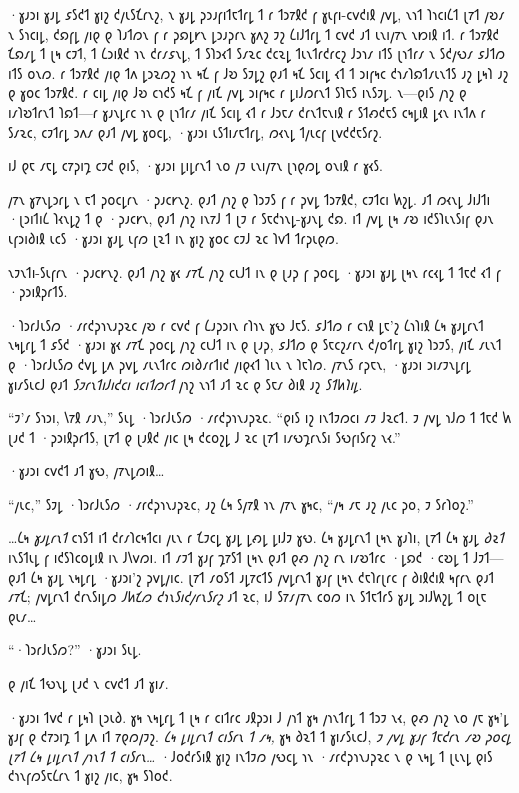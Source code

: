 ·𐑣𐑨𐑮𐑦 𐑣𐑨𐑛 𐑭𐑕𐑒𐑑 𐑣𐑦𐑟 𐑒𐑢𐑧𐑕𐑗𐑩𐑯𐑟, 𐑯 𐑣𐑨𐑛 𐑜𐑮𐑨𐑝𐑦𐑑𐑱𐑑𐑩𐑛 𐑑 𐑩 𐑑𐑮𐑳𐑙𐑒 𐑝 𐑣𐑧𐑝𐑦-𐑤𐑫𐑒𐑦𐑙 𐑢𐑫𐑛, 𐑯𐑪𐑑 𐑐𐑪𐑤𐑦𐑖𐑑 𐑚𐑳𐑑 𐑢𐑹𐑥 𐑯 𐑕𐑪𐑤𐑦𐑛, 𐑒𐑸𐑝𐑛 𐑢𐑦𐑞 𐑞 𐑐𐑨𐑑𐑼𐑯 𐑝 𐑩 𐑜𐑸𐑛𐑾𐑯 𐑛𐑮𐑨𐑜𐑩𐑯 𐑣𐑵𐑟 𐑲𐑟 𐑖𐑦𐑓𐑑𐑩𐑛 𐑑 𐑤𐑫𐑒 𐑨𐑑 𐑧𐑯𐑦𐑢𐑳𐑯 𐑯𐑽𐑦𐑙 𐑦𐑑. 𐑩 𐑑𐑮𐑳𐑙𐑒 𐑗𐑸𐑥𐑛 𐑑 𐑚𐑰 𐑤𐑲𐑑, 𐑑 𐑖𐑮𐑦𐑙𐑒 𐑪𐑯 𐑒𐑩𐑥𐑭𐑯𐑛, 𐑑 𐑕𐑐𐑮𐑬𐑑 𐑕𐑥𐑷𐑤 𐑒𐑤𐑷𐑛 𐑑𐑧𐑯𐑑𐑩𐑒𐑩𐑤𐑟 𐑓𐑮𐑪𐑥 𐑦𐑑𐑕 𐑚𐑪𐑑𐑩𐑥 𐑯 𐑕𐑒𐑢𐑻𐑥 𐑭𐑓𐑑𐑼 𐑦𐑑𐑕 𐑴𐑯𐑼. 𐑩 𐑑𐑮𐑳𐑙𐑒 𐑢𐑦𐑞 𐑑𐑵 𐑛𐑮𐑷𐑼𐑟 𐑪𐑯 𐑰𐑗 𐑝 𐑓𐑹 𐑕𐑲𐑛𐑟 𐑞𐑨𐑑 𐑰𐑗 𐑕𐑤𐑦𐑛 𐑬𐑑 𐑑 𐑮𐑦𐑝𐑰𐑤 𐑒𐑪𐑥𐑐𐑸𐑑𐑥𐑧𐑯𐑑𐑕 𐑨𐑟 𐑛𐑰𐑐 𐑨𐑟 𐑞 𐑣𐑴𐑤 𐑑𐑮𐑳𐑙𐑒. 𐑩 𐑤𐑦𐑛 𐑢𐑦𐑞 𐑓𐑹 𐑤𐑪𐑒𐑕 𐑰𐑗 𐑝 𐑢𐑦𐑗 𐑢𐑫𐑛 𐑮𐑦𐑝𐑰𐑤 𐑩 𐑛𐑦𐑓𐑼𐑩𐑯𐑑 𐑕𐑐𐑱𐑕 𐑦𐑯𐑕𐑲𐑛. 𐑯—𐑞𐑦𐑕 𐑢𐑪𐑟 𐑞 𐑦𐑥𐑐𐑹𐑑𐑩𐑯𐑑 𐑐𐑸𐑑—𐑩 𐑣𐑨𐑯𐑛𐑩𐑤 𐑪𐑯 𐑞 𐑚𐑪𐑑𐑩𐑥 𐑢𐑦𐑗 𐑕𐑤𐑦𐑛 𐑬𐑑 𐑩 𐑓𐑮𐑱𐑥 𐑒𐑩𐑯𐑑𐑱𐑯𐑦𐑙 𐑩 𐑕𐑑𐑺𐑒𐑱𐑕 𐑤𐑰𐑛𐑦𐑙 𐑛𐑬𐑯 𐑦𐑯𐑑𐑵 𐑩 𐑕𐑥𐑷𐑤, 𐑤𐑲𐑑𐑩𐑛 𐑮𐑵𐑥 𐑞𐑨𐑑 𐑢𐑫𐑛 𐑣𐑴𐑤𐑛, ·𐑣𐑨𐑮𐑦 𐑧𐑕𐑑𐑦𐑥𐑱𐑑𐑩𐑛, 𐑼𐑬𐑯𐑛 𐑑𐑢𐑧𐑤𐑝 𐑚𐑫𐑒𐑒𐑱𐑕𐑩𐑟.

𐑦𐑓 𐑞𐑱 𐑥𐑱𐑛 𐑤𐑳𐑜𐑦𐑡 𐑤𐑲𐑒 𐑞𐑦𐑕, ·𐑣𐑨𐑮𐑦 𐑛𐑦𐑛𐑩𐑯𐑑 𐑯𐑴 𐑢𐑲 𐑧𐑯𐑦𐑢𐑳𐑯 𐑚𐑪𐑞𐑼𐑛 𐑴𐑯𐑦𐑙 𐑩 𐑣𐑬𐑕.

𐑢𐑳𐑯 𐑣𐑳𐑯𐑛𐑮𐑩𐑛 𐑯 𐑱𐑑 𐑜𐑴𐑤𐑛𐑩𐑯 ·𐑜𐑨𐑤𐑾𐑯𐑟. 𐑞𐑨𐑑 𐑢𐑪𐑟 𐑞 𐑐𐑮𐑲𐑕 𐑝 𐑩 𐑜𐑫𐑛 𐑑𐑮𐑳𐑙𐑒, 𐑤𐑲𐑑𐑤𐑦 𐑿𐑟𐑛. 𐑨𐑑 𐑼𐑬𐑯𐑛 𐑓𐑦𐑓𐑑𐑦 ·𐑚𐑮𐑦𐑑𐑦𐑖 𐑐𐑬𐑯𐑛𐑟 𐑑 𐑞 ·𐑜𐑨𐑤𐑾𐑯, 𐑞𐑨𐑑 𐑢𐑪𐑟 𐑦𐑯𐑳𐑓 𐑑 𐑚𐑲 𐑩 𐑕𐑱𐑒𐑪𐑯𐑛-𐑣𐑨𐑯𐑛 𐑒𐑸. 𐑦𐑑 𐑢𐑫𐑛 𐑚𐑰 𐑥𐑹 𐑦𐑒𐑕𐑐𐑧𐑯𐑕𐑦𐑝 𐑞𐑨𐑯 𐑧𐑝𐑮𐑦𐑔𐑦𐑙 𐑧𐑤𐑕 ·𐑣𐑨𐑮𐑦 𐑣𐑨𐑛 𐑧𐑝𐑼 𐑚𐑷𐑑 𐑦𐑯 𐑣𐑦𐑟 𐑣𐑴𐑤 𐑤𐑲𐑓 𐑷𐑤 𐑐𐑫𐑑 𐑑𐑩𐑜𐑧𐑞𐑼.

𐑯𐑲𐑯𐑑𐑦-𐑕𐑧𐑝𐑩𐑯 ·𐑜𐑨𐑤𐑾𐑯𐑟. 𐑞𐑨𐑑 𐑢𐑪𐑟 𐑣𐑬 𐑥𐑳𐑗 𐑢𐑪𐑟 𐑤𐑧𐑓𐑑 𐑦𐑯 𐑞 𐑚𐑨𐑜 𐑝 𐑜𐑴𐑤𐑛 ·𐑣𐑨𐑮𐑦 𐑣𐑨𐑛 𐑚𐑰𐑯 𐑩𐑤𐑬𐑛 𐑑 𐑑𐑱𐑒 𐑬𐑑 𐑝 ·𐑜𐑮𐑦𐑙𐑜𐑩𐑑𐑕.

·𐑐𐑮𐑩𐑓𐑧𐑕𐑼 ·𐑥𐑩𐑒𐑜𐑪𐑯𐑨𐑜𐑷𐑤 𐑢𐑹 𐑩 𐑤𐑫𐑒 𐑝 𐑖𐑨𐑜𐑮𐑦𐑯 𐑩𐑐𐑪𐑯 𐑣𐑻 𐑓𐑱𐑕. 𐑭𐑓𐑑𐑼 𐑩 𐑤𐑪𐑙 𐑛𐑱'𐑟 𐑖𐑪𐑐𐑦𐑙 𐑖𐑰 𐑣𐑨𐑛𐑩𐑯𐑑 𐑯𐑰𐑛𐑩𐑛 𐑑 𐑭𐑕𐑒 ·𐑣𐑨𐑮𐑦 𐑣𐑬 𐑥𐑳𐑗 𐑜𐑴𐑤𐑛 𐑢𐑪𐑟 𐑤𐑧𐑓𐑑 𐑦𐑯 𐑞 𐑚𐑨𐑜, 𐑭𐑓𐑑𐑼 𐑞 𐑕𐑱𐑤𐑟𐑥𐑩𐑯 𐑒𐑢𐑴𐑑𐑩𐑛 𐑣𐑦𐑟 𐑐𐑮𐑲𐑕, 𐑢𐑦𐑗 𐑥𐑧𐑯𐑑 𐑞 ·𐑐𐑮𐑩𐑓𐑧𐑕𐑼 𐑒𐑫𐑛 𐑛𐑵 𐑜𐑫𐑛 𐑥𐑧𐑯𐑑𐑩𐑤 𐑼𐑦𐑔𐑥𐑩𐑑𐑦𐑒 𐑢𐑦𐑞𐑬𐑑 𐑐𐑧𐑯 𐑯 𐑐𐑱𐑐𐑼. 𐑢𐑳𐑯𐑕 𐑩𐑜𐑱𐑯, ·𐑣𐑨𐑮𐑦 𐑮𐑦𐑥𐑲𐑯𐑛𐑩𐑛 𐑣𐑦𐑥𐑕𐑧𐑤𐑓 𐑞𐑨𐑑 \emph{𐑕𐑲𐑩𐑯𐑑𐑦𐑓𐑦𐑒𐑤𐑦 𐑦𐑤𐑦𐑑𐑼𐑩𐑑} 𐑢𐑪𐑟 𐑯𐑪𐑑 𐑨𐑑 𐑷𐑤 𐑞 𐑕𐑱𐑥 𐑔𐑦𐑙 𐑨𐑟 \emph{𐑕𐑑𐑿𐑐𐑦𐑛}.

“𐑲'𐑥 𐑕𐑪𐑮𐑦, 𐑘𐑳𐑙 𐑥𐑨𐑯,” 𐑕𐑧𐑛 ·𐑐𐑮𐑩𐑓𐑧𐑕𐑼 ·𐑥𐑩𐑒𐑜𐑪𐑯𐑨𐑜𐑷𐑤. “𐑞𐑦𐑕 𐑦𐑟 𐑦𐑯𐑑𐑲𐑼𐑤𐑦 𐑥𐑲 𐑓𐑷𐑤𐑑. 𐑲 𐑢𐑫𐑛 𐑪𐑓𐑼 𐑑 𐑑𐑱𐑒 𐑿 𐑚𐑨𐑒 𐑑 ·𐑜𐑮𐑦𐑙𐑜𐑩𐑑𐑕, 𐑚𐑳𐑑 𐑞 𐑚𐑨𐑙𐑒 𐑢𐑦𐑤 𐑚𐑰 𐑒𐑤𐑴𐑟𐑛 𐑓 𐑷𐑤 𐑚𐑳𐑑 𐑦𐑥𐑻𐑡𐑩𐑯𐑕𐑦 𐑕𐑻𐑝𐑦𐑕𐑩𐑟 𐑯𐑬.”

·𐑣𐑨𐑮𐑦 𐑤𐑫𐑒𐑑 𐑨𐑑 𐑣𐑻, 𐑢𐑳𐑯𐑛𐑼𐑦𐑙…

“𐑢𐑧𐑤,” 𐑕𐑲𐑛 ·𐑐𐑮𐑩𐑓𐑧𐑕𐑼 ·𐑥𐑩𐑒𐑜𐑪𐑯𐑨𐑜𐑷𐑤, 𐑨𐑟 𐑖𐑰 𐑕𐑢𐑳𐑙 𐑪𐑯 𐑢𐑳𐑯 𐑣𐑰𐑤, “𐑢𐑰 𐑥𐑱 𐑨𐑟 𐑢𐑧𐑤 𐑜𐑴, 𐑲 𐑕𐑩𐑐𐑴𐑟.”

…𐑖𐑰 \emph{𐑣𐑨𐑛𐑩𐑯𐑑} 𐑤𐑪𐑕𐑑 𐑦𐑑 𐑒𐑩𐑥𐑐𐑤𐑰𐑑𐑤𐑦 𐑢𐑧𐑯 𐑩 𐑗𐑲𐑤𐑛 𐑣𐑨𐑛 𐑛𐑺𐑛 𐑛𐑦𐑓𐑲 𐑣𐑻. 𐑖𐑰 𐑣𐑨𐑛𐑩𐑯𐑑 𐑚𐑰𐑯 𐑣𐑨𐑐𐑦, 𐑚𐑳𐑑 𐑖𐑰 𐑣𐑨𐑛 \emph{𐑔𐑷𐑑} 𐑦𐑯𐑕𐑑𐑧𐑛 𐑝 𐑦𐑒𐑕𐑐𐑤𐑴𐑛𐑦𐑙 𐑦𐑯 𐑓𐑘𐑫𐑼𐑦. 𐑦𐑑 𐑥𐑲𐑑 𐑣𐑨𐑝 𐑡𐑳𐑕𐑑 𐑚𐑰𐑯 𐑞𐑨𐑑 𐑞𐑺 𐑢𐑪𐑟 𐑩𐑯 𐑦𐑥𐑹𐑑𐑩𐑤 ·𐑛𐑸𐑒 ·𐑤𐑹𐑛 𐑑 𐑓𐑲𐑑—𐑞𐑨𐑑 𐑖𐑰 𐑣𐑨𐑛 𐑯𐑰𐑛𐑩𐑛 ·𐑣𐑨𐑮𐑦'𐑟 𐑜𐑫𐑛𐑢𐑦𐑤. 𐑚𐑳𐑑 𐑥𐑴𐑕𐑑 𐑨𐑛𐑳𐑤𐑑𐑕 𐑢𐑫𐑛𐑩𐑯𐑑 𐑣𐑨𐑝 𐑚𐑰𐑯 𐑒𐑱𐑐𐑩𐑚𐑩𐑤 𐑝 𐑔𐑦𐑙𐑒𐑦𐑙 𐑰𐑝𐑩𐑯 𐑞𐑨𐑑 𐑥𐑳𐑗; 𐑢𐑫𐑛𐑩𐑯𐑑 𐑒𐑩𐑯𐑕𐑦𐑛𐑼 \emph{𐑓𐑿𐑗𐑼 𐑒𐑪𐑯𐑕𐑦𐑒𐑢𐑩𐑯𐑕𐑩𐑟} 𐑨𐑑 𐑷𐑤, 𐑦𐑓 𐑕𐑳𐑥𐑢𐑳𐑯 𐑤𐑴𐑼 𐑦𐑯 𐑕𐑑𐑱𐑑𐑩𐑕 𐑣𐑨𐑛 𐑮𐑦𐑓𐑿𐑟𐑛 𐑑 𐑴𐑚𐑱 𐑞𐑧𐑥…

“·𐑐𐑮𐑩𐑓𐑧𐑕𐑼?” ·𐑣𐑨𐑮𐑦 𐑕𐑧𐑛.

𐑞 𐑢𐑦𐑗 𐑑𐑻𐑯𐑛 𐑚𐑨𐑒 𐑯 𐑤𐑫𐑒𐑑 𐑨𐑑 𐑣𐑦𐑥.

·𐑣𐑨𐑮𐑦 𐑑𐑫𐑒 𐑩 𐑛𐑰𐑐 𐑚𐑮𐑧𐑔. 𐑣𐑰 𐑯𐑰𐑛𐑩𐑛 𐑑 𐑚𐑰 𐑩 𐑤𐑦𐑑𐑩𐑤 𐑨𐑙𐑜𐑮𐑦 𐑓 𐑢𐑪𐑑 𐑣𐑰 𐑢𐑪𐑯𐑑𐑩𐑛 𐑑 𐑑𐑮𐑲 𐑯𐑬, 𐑞𐑺 𐑢𐑪𐑟 𐑯𐑴 𐑢𐑱 𐑣𐑰'𐑛 𐑣𐑨𐑝 𐑞 𐑒𐑳𐑮𐑦𐑡 𐑑 𐑛𐑵 𐑦𐑑 𐑳𐑞𐑼𐑢𐑲𐑟. \emph{𐑖𐑰 𐑛𐑦𐑛𐑩𐑯𐑑 𐑤𐑦𐑕𐑩𐑯 𐑑 𐑥𐑰,} 𐑣𐑰 𐑔𐑷𐑑 𐑑 𐑣𐑦𐑥𐑕𐑧𐑤𐑓, \emph{𐑲 𐑢𐑫𐑛 𐑣𐑨𐑝 𐑑𐑱𐑒𐑩𐑯 𐑥𐑹 𐑜𐑴𐑤𐑛 𐑚𐑳𐑑 𐑖𐑰 𐑛𐑦𐑛𐑩𐑯𐑑 𐑢𐑪𐑯𐑑 𐑑 𐑤𐑦𐑕𐑩𐑯…} ·𐑓𐑴𐑒𐑩𐑕𐑦𐑙 𐑣𐑦𐑟 𐑦𐑯𐑑𐑲𐑼 𐑢𐑻𐑤𐑛 𐑪𐑯 ·𐑥𐑩𐑒𐑜𐑪𐑯𐑨𐑜𐑷𐑤 𐑯 𐑞 𐑯𐑰𐑛 𐑑 𐑚𐑧𐑯𐑛 𐑞𐑦𐑕 𐑒𐑪𐑯𐑝𐑼𐑕𐑱𐑖𐑩𐑯 𐑑 𐑣𐑦𐑟 𐑢𐑦𐑤, 𐑣𐑰 𐑕𐑐𐑴𐑒.

